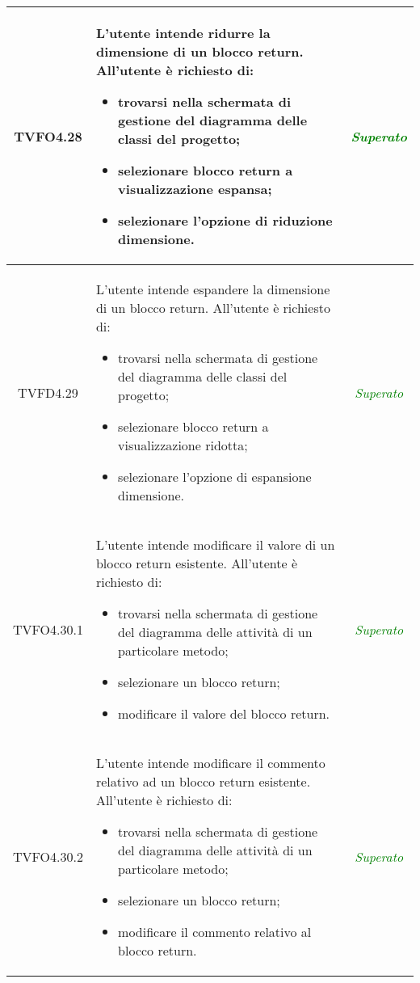 \begin{longtable}{|c|>{}m{8cm}|c|}
\hypertarget{TVFO4.28}{TVFO4.28} & L'utente intende ridurre la dimensione di un blocco return.
All'utente è richiesto di:
\begin{itemize}
	\item trovarsi nella schermata di gestione del diagramma delle classi del progetto;
	\item selezionare blocco return a visualizzazione espansa;
	\item selezionare l'opzione di riduzione dimensione.
\end{itemize} & \textcolor{Green}{\textit{Superato}}\\ \hline

\hypertarget{TVFD4.29}{TVFD4.29} & L'utente intende espandere la dimensione di un blocco return.
All'utente è richiesto di:
\begin{itemize}
	\item trovarsi nella schermata di gestione del diagramma delle classi del progetto;
	\item selezionare blocco return a visualizzazione ridotta;
	\item selezionare l'opzione di espansione dimensione.
\end{itemize} & \textcolor{Green}{\textit{Superato}}\\ \hline

\hypertarget{TVFO4.30.1}{TVFO4.30.1} & L'utente intende modificare il valore di un blocco return esistente.
All'utente è richiesto di:
\begin{itemize}
	\item trovarsi nella schermata di gestione del diagramma delle attività di un particolare metodo;
	\item selezionare un blocco return;
	\item modificare il valore del blocco return.
\end{itemize} & \textcolor{Green}{\textit{Superato}}\\ \hline

\hypertarget{TVFO4.30.2}{TVFO4.30.2} & L'utente intende modificare il commento relativo ad un blocco return esistente.
All'utente è richiesto di:
\begin{itemize}
	\item trovarsi nella schermata di gestione del diagramma delle attività di un particolare metodo;
	\item selezionare un blocco return;
	\item modificare il commento relativo al blocco return.
\end{itemize} & \textcolor{Green}{\textit{Superato}}\\ \hline


\end{longtable}
